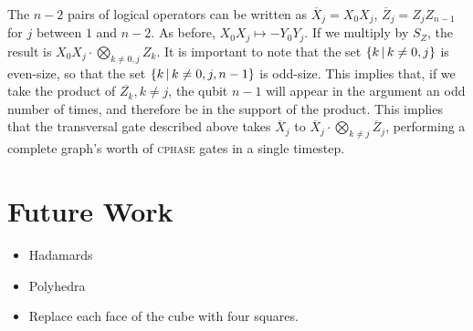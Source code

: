 \documentclass[a4paper, english]{scrartcl}
\begin{document}
The $n-2$ pairs of logical operators can be written as $\overline{X}_j = X_0 X_j$, $\overline{Z}_j = Z_j Z_{n-1}$ for $j$ between $1$ and $n-2$. 
As before, $X_0 X_j \mapsto -Y_0 Y_j$. 
If we multiply by $S_Z$, the result is $X_0 X_j \cdot \bigotimes_{k \neq 0, j} Z_k$.
It is important to note that the set $\left \lbrace k \, \middle \vert \, k\neq 0,j \right \rbrace$ is even-size, so that the set $\left \lbrace k \, \middle \vert \, k\neq 0,j,n-1 \right \rbrace$ is odd-size. 
This implies that, if we take the product of $\overline{Z_k}, k \neq j$, the qubit $n-1$ will appear in the argument an odd number of times, and therefore be in the support of the product. 
This implies that the transversal gate described above takes $\overline{X}_j$ to $\overline{X}_j \cdot \bigotimes_{k \neq j} \overline{Z}_j$, performing a complete graph's worth of \textsc{cphase} gates in a single timestep. 

\section{Future Work}
\begin{itemize}
\item Hadamards
\item Polyhedra
\item Replace each face of the cube with four squares. 
\end{itemize}
\end{document}
